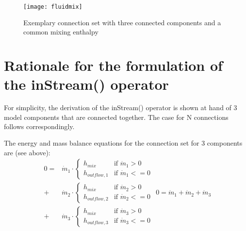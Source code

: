 \begin{figure}[H]
\caption{Exemplary connection set with three connected components and a common mixing enthalpy}
\begin{center}
\texttt{[image: fluidmix]}
\end{center}
\end{figure}

\section{Rationale for the formulation of the inStream() operator}

For simplicity, the derivation of the inStream() operator is shown at
hand of 3 model components that are connected together. The case for N
connections follows correspondingly.

The energy and mass balance equations for the connection set for 3
components are (see above):
\begin{subequations}
\begin{equation}
\begin{split}
0=&\dot{m}_1\cdot
\begin{cases}
h_{mix}&\text{if $\dot{m}_1>0$}\\
h_{outflow,1}&\text{if $\dot{m}_1<=0$}
\end{cases}\\
+&\dot{m}_2\cdot
\begin{cases}
h_{mix}&\text{if $\dot{m}_2>0$}\\
h_{outflow,2}&\text{if $\dot{m}_2<=0$}
\end{cases}\\
+&\dot{m}_3\cdot
\begin{cases}
h_{mix}&\text{if $\dot{m}_3>0$}\\
h_{outflow,3}&\text{if $\dot{m}_3<=0$}
\end{cases}
\end{split}
\label{eq:D1a}
\end{equation}
\begin{equation}
0=\dot{m}_1+\dot{m}_2+\dot{m}_3
\label{eq:D1b}
\end{equation}
\label{eq:D1}
\end{subequations}

